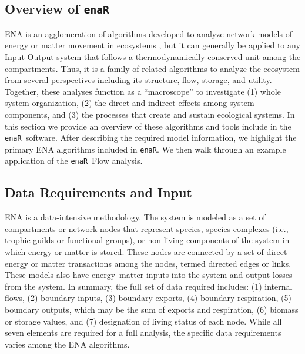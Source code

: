 \documentclass[11pt]{article}
\newcommand{\enaR}{\texttt{enaR}}
\begin{document}
\begin{spacing}{2}
\section{Overview of \enaR}
ENA is an agglomeration of algorithms developed to analyze network
models of energy or matter movement in ecosystems
\citep[e.g.,][]{hannon73, fath99_review, ulanowicz86}, but it can
generally be applied to any Input-Output system that follows a
thermodynamically conserved unit among the compartments.  Thus, it is a
family of related algorithms to analyze the ecosystem from several
perspectives including its structure, flow, storage, and utility.
Together, these analyses function as a ``macroscope'' to investigate
(1) whole system organization, (2) the direct and indirect effects
among system components, and (3) the processes that create and sustain
ecological systems.
In this section we provide an overview of these algorithms and tools
include in the \enaR\ software.  After describing the required model
information, we highlight the primary ENA algorithms included in
\enaR .  We then walk through an example application of the \enaR\ Flow
analysis.

\subsection{Data Requirements and Input}
ENA is a data-intensive methodology.  The system is modeled as a set
of compartments or network nodes that represent species,
species-complexes (i.e., trophic guilds or functional groups), or
non-living components of the system in which energy or matter is
stored.  These nodes are connected by a set of direct energy or matter
transactions among the nodes, termed directed edges or links.  These
models also have energy--matter inputs into the system and output
losses from the system.  In summary, the full set of data required includes:
(1) internal flows, (2) boundary inputs, (3) boundary exports, (4)
boundary respiration, (5) boundary outputs, which may be the sum of
exports and respiration, (6) biomass or storage values, and (7)
designation of living status of each node.  While all seven elements
are required for a full analysis, the specific data requirements
varies among the ENA algorithms.


\end{spacing}
\end{document}
